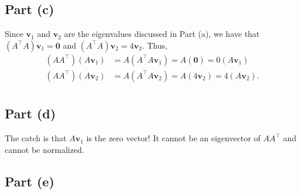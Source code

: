\documentclass[11pt]{article}
\renewcommand{\vec}[1]{\mathbf{#1}}
\begin{document}

\subsection{Part (c)}

Since $\vec{v}_{1}$ and $\vec{v}_{2}$ are the eigenvalues discussed in Part (a), we have that $(A^{\top}A) \vec{v}_{1} = \vec{0}$ and $(A^{\top}A) \vec{v}_{2} = 4 \vec{v}_{2}$. Thus,
\begin{align*}
	(AA^{\top})(A \vec{v}_{1}) &= A (A^{\top}A \vec{v}_{1}) = A(\vec{0}) = 0(A \vec{v}_{1}) \\
	(AA^{\top})(A \vec{v}_{2}) &= A (A^{\top}A \vec{v}_{2}) = A(4 \vec{v}_{2}) = 4(A \vec{v}_{2}). \\
\end{align*}


\subsection{Part (d)}

The catch is that $A \vec{v}_{1}$ is the zero vector! It cannot be an eigenvector of $AA^{\top}$ and cannot be normalized.


\subsection{Part (e)}
\end{document}
